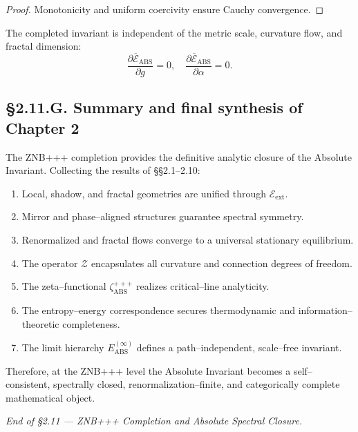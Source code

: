 \begin{proof}
Monotonicity and uniform coercivity ensure Cauchy convergence.
\end{proof}

\begin{corollary}
The completed invariant is independent of the metric scale, curvature flow, and fractal dimension:
\[
\frac{\partial \overline{\mathcal{E}}_{\mathrm{ABS}}}{\partial g}=0,\quad
\frac{\partial \overline{\mathcal{E}}_{\mathrm{ABS}}}{\partial \alpha}=0.
\]
\]
\end{corollary}

\subsection*{§2.11.G. Summary and final synthesis of Chapter 2}

The ZNB+++ completion provides the definitive analytic closure of the Absolute Invariant.  
Collecting the results of §§2.1–2.10:

\begin{enumerate}
  \item Local, shadow, and fractal geometries are unified through $\mathcal{E}_{\mathrm{ext}}$.
  \item Mirror and phase–aligned structures guarantee spectral symmetry.
  \item Renormalized and fractal flows converge to a universal stationary equilibrium.
  \item The operator $\mathcal{Z}$ encapsulates all curvature and connection degrees of freedom.
  \item The zeta–functional $\zeta_{\mathrm{ABS}}^{+++}$ realizes critical–line analyticity.
  \item The entropy–energy correspondence secures thermodynamic and information–theoretic completeness.
  \item The limit hierarchy $E^{(\infty)}_{\mathrm{ABS}}$ defines a path–independent, scale–free invariant.
\end{enumerate}

Therefore, at the ZNB+++ level the Absolute Invariant becomes a self–consistent, spectrally closed,
renormalization–finite, and categorically complete mathematical object.

\begin{center}
\textit{End of §2.11 — ZNB+++ Completion and Absolute Spectral Closure.}
\end{center}


